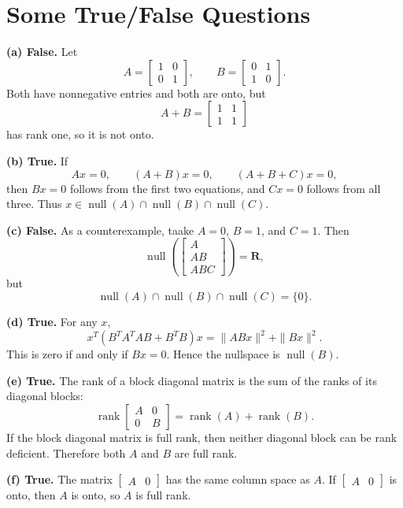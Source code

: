 \section{Some True/False Questions}

\textbf{(a) False.}
Let
\[
    A =
    \begin{bmatrix}1&0\\0&1\end{bmatrix},
    \qquad
    B =
    \begin{bmatrix}0&1\\1&0\end{bmatrix}.
\]
Both have nonnegative entries and both are onto, but
\[
    A+B =
    \begin{bmatrix}1&1\\1&1\end{bmatrix}
\]
has rank one, so it is not onto.

\textbf{(b) True.}
If
\[
    Ax=0,\qquad (A+B)x=0,\qquad (A+B+C)x=0,
\]
then \(Bx=0\) follows from the first two equations, and \(Cx=0\)
follows from all three. Thus \(x\in\operatorname{null}(A)\cap
\operatorname{null}(B)\cap\operatorname{null}(C)\).%

\textbf{(c) False.}
As a counterexample, taake \(A=0\), \(B=1\), and \(C=1\). Then
\[
    \operatorname{null}
    \left(
    \begin{bmatrix}
        A\\ AB\\ ABC
    \end{bmatrix}
    \right)
    =
    \mathbf{R},
\]
but
\[
    \operatorname{null}(A)\cap\operatorname{null}(B)\cap
    \operatorname{null}(C)
    =
    \{0\}.
\]

\textbf{(d) True.}
For any \(x\),
\[
    x^T(B^T A^T A B+B^T B)x
    =
    \|ABx\|^2+\|Bx\|^2.
\]
This is zero if and only if \(Bx=0\). Hence the nullspace is
\(\operatorname{null}(B)\).

\textbf{(e) True.}
The rank of a block diagonal matrix is the sum of the ranks of its
diagonal blocks:
\[
    \operatorname{rank}
    \begin{bmatrix}
        A&0\\0&B
    \end{bmatrix}
    =
    \operatorname{rank}(A)+\operatorname{rank}(B).
\]
If the block diagonal matrix is full rank, then neither diagonal block
can be rank deficient. Therefore both \(A\) and \(B\) are full rank.

\textbf{(f) True.}
The matrix \(\begin{bmatrix} A&0\end{bmatrix}\) has the same column space
as \(A\). If \(\begin{bmatrix} A&0\end{bmatrix}\) is onto, then \(A\) is
onto, so \(A\) is full rank.

